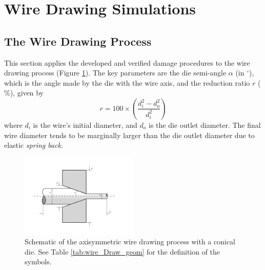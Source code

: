 \documentclass[sn-mathphys,Numbered]{sn-jnl}%
\begin{document}
\section{Wire Drawing Simulations} \label{sec:wire_drawing}

\subsection{The Wire Drawing Process}

This section applies the developed and verified damage procedures to the wire drawing process (Figure \ref{fig:wireDrawing}).
The key parameters are the die semi-angle $\alpha$ (in $^{\circ}$), which is the angle made by the die with the wire axis, and the reduction ratio $r$ ($\%$), given by
\begin{equation}
    r = 100 \times \left(\frac{d_i^2 - d_o^2}{d_i^2}\right)
\end{equation}
where $d_i$ is the wire's initial diameter, and $d_o$ is the die outlet diameter.
The final wire diameter tends to be marginally larger than the die outlet diameter due to elastic \emph{spring back}.
\begin{figure}[htb]
\begin{center}
	\includegraphics[width=0.5\textwidth]{./Figures/SimulationAndAnalysis/modelCompare/drawingSchematic.pdf}
	\caption{Schematic of the axisymmetric wire drawing process with a conical die. See Table \ref{tab:wire_Draw_geom} for the definition of the symbols.}
	\label{fig:wireDrawing}
\end{center}
\end{figure}

\end{document}
